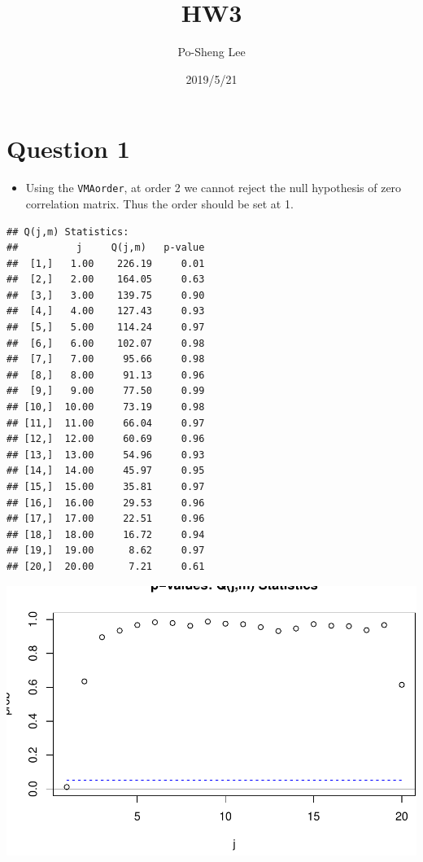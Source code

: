 \documentclass[]{article}
\title{HW3}
\author{Po-Sheng Lee}
\date{2019/5/21}
\providecommand{\tightlist}{%
  \setlength{\itemsep}{0pt}\setlength{\parskip}{0pt}}
\begin{document}
\maketitle

\section{Question 1}\label{question-1}

\begin{itemize}
\tightlist
\item
  Using the \texttt{VMAorder}, at order 2 we cannot reject the null
  hypothesis of zero correlation matrix. Thus the order should be set at
  1.
\end{itemize}

\begin{verbatim}
## Q(j,m) Statistics:  
##          j     Q(j,m)   p-value
##  [1,]   1.00    226.19     0.01
##  [2,]   2.00    164.05     0.63
##  [3,]   3.00    139.75     0.90
##  [4,]   4.00    127.43     0.93
##  [5,]   5.00    114.24     0.97
##  [6,]   6.00    102.07     0.98
##  [7,]   7.00     95.66     0.98
##  [8,]   8.00     91.13     0.96
##  [9,]   9.00     77.50     0.99
## [10,]  10.00     73.19     0.98
## [11,]  11.00     66.04     0.97
## [12,]  12.00     60.69     0.96
## [13,]  13.00     54.96     0.93
## [14,]  14.00     45.97     0.95
## [15,]  15.00     35.81     0.97
## [16,]  16.00     29.53     0.96
## [17,]  17.00     22.51     0.96
## [18,]  18.00     16.72     0.94
## [19,]  19.00      8.62     0.97
## [20,]  20.00      7.21     0.61
\end{verbatim}

\includegraphics{HW3_files/figure-latex/unnamed-chunk-1-1.pdf}
\end{document}
